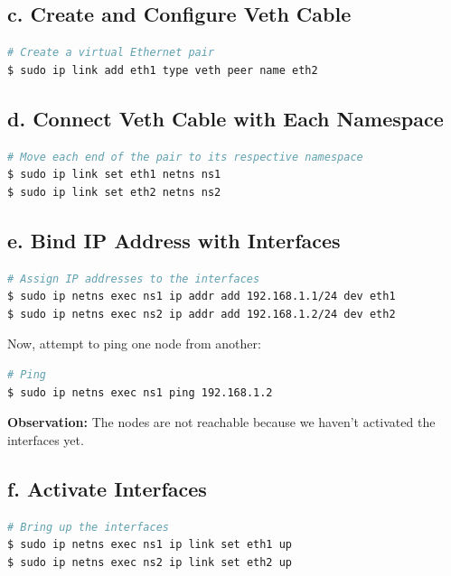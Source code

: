 \documentclass{report}
\begin{document}
\subsection*{c. Create and Configure Veth Cable}

\begin{lstlisting}[language=bash]
# Create a virtual Ethernet pair
$ sudo ip link add eth1 type veth peer name eth2
\end{lstlisting}

\subsection*{d. Connect Veth Cable with Each Namespace}

\begin{lstlisting}[language=bash]
# Move each end of the pair to its respective namespace
$ sudo ip link set eth1 netns ns1
$ sudo ip link set eth2 netns ns2
\end{lstlisting}

\subsection*{e. Bind IP Address with Interfaces}

\begin{lstlisting}[language=bash]
# Assign IP addresses to the interfaces
$ sudo ip netns exec ns1 ip addr add 192.168.1.1/24 dev eth1
$ sudo ip netns exec ns2 ip addr add 192.168.1.2/24 dev eth2
\end{lstlisting}

Now, attempt to ping one node from another:

\begin{lstlisting}[language=bash]
# Ping
$ sudo ip netns exec ns1 ping 192.168.1.2
\end{lstlisting}

\textbf{Observation:} The nodes are not reachable because we haven't activated the interfaces yet.

\subsection*{f. Activate Interfaces}

\begin{lstlisting}[language=bash]
# Bring up the interfaces
$ sudo ip netns exec ns1 ip link set eth1 up
$ sudo ip netns exec ns2 ip link set eth2 up
\end{lstlisting}
\end{document}
